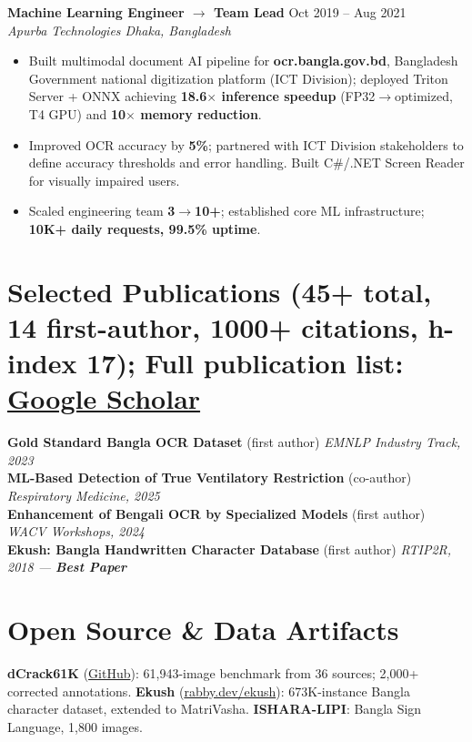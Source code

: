\documentclass[10pt,letterpaper]{article}
\newcommand{\role}[3]{\textbf{#1} \hfill {\small\color{muted}#2}\\[-0.5pt]{\small\itshape\color{muted} #3}}
\begin{document}
\role{Machine Learning Engineer $\to$ Team Lead}{Oct 2019 -- Aug 2021}
     {Apurba Technologies \hfill Dhaka, Bangladesh}
\begin{itemize}
  \item Built multimodal document AI pipeline for \textbf{ocr.bangla.gov.bd}, Bangladesh Government national digitization platform (ICT Division); deployed Triton Server + ONNX achieving \textbf{18.6$\times$ inference speedup} (FP32$\to$optimized, T4 GPU) and \textbf{10$\times$ memory reduction}.
  \item Improved OCR accuracy by \textbf{5\%}; partnered with ICT Division stakeholders to define accuracy thresholds and error handling. Built C\#/.NET Screen Reader for visually impaired users.
  \item Scaled engineering team \textbf{3$\to$10+}; established core ML infrastructure; \textbf{10K+ daily requests, 99.5\% uptime}.
\end{itemize}
\section*{Selected Publications {\small\normalfont\color{muted}(45+ total, 14 first-author, 1000+ citations, h-index 17); Full publication list: \href{https://scholar.google.com/citations?user=_Rm1Xk4AAAAJ&hl=en}{Google Scholar}}}
{\small
\textbf{Gold Standard Bangla OCR Dataset} (first author) \hfill \textit{EMNLP Industry Track, 2023}\\
\textbf{ML-Based Detection of True Ventilatory Restriction} (co-author) \hfill \textit{Respiratory Medicine, 2025}\\
\textbf{Enhancement of Bengali OCR by Specialized Models} (first author) \hfill \textit{WACV Workshops, 2024}\\
\textbf{Ekush: Bangla Handwritten Character Database} (first author) \hfill \textit{RTIP2R, 2018 --- \textbf{Best Paper}}
}
\section*{Open Source \& Data Artifacts}
{\small
\textbf{dCrack61K} (\href{https://github.com/shahariarrabby}{GitHub}): 61,943-image benchmark from 36 sources; 2,000+ corrected annotations.\quad
\textbf{Ekush} (\href{https://rabby.dev/ekush}{rabby.dev/ekush}): 673K-instance Bangla character dataset, extended to MatriVasha.\quad
\textbf{ISHARA-LIPI}: Bangla Sign Language, 1,800 images.
}
\end{document}
